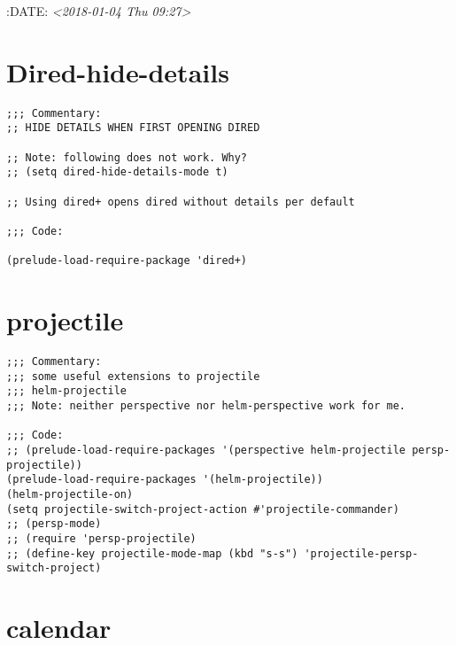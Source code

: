 \documentclass[11pt]{article}
\begin{document}
:DATE:     \textit{<2018-01-04 Thu 09:27>}
\section{Dired-hide-details}
\label{sec:org2a95887}

\begin{verbatim}
;;; Commentary:
;; HIDE DETAILS WHEN FIRST OPENING DIRED

;; Note: following does not work. Why?
;; (setq dired-hide-details-mode t)

;; Using dired+ opens dired without details per default

;;; Code:

(prelude-load-require-package 'dired+)
\end{verbatim}

\section{projectile}
\label{sec:org7df3bad}
\begin{verbatim}
;;; Commentary:
;;; some useful extensions to projectile
;;; helm-projectile
;;; Note: neither perspective nor helm-perspective work for me.

;;; Code:
;; (prelude-load-require-packages '(perspective helm-projectile persp-projectile))
(prelude-load-require-packages '(helm-projectile))
(helm-projectile-on)
(setq projectile-switch-project-action #'projectile-commander)
;; (persp-mode)
;; (require 'persp-projectile)
;; (define-key projectile-mode-map (kbd "s-s") 'projectile-persp-switch-project)
\end{verbatim}

\section{calendar}
\label{sec:orga9cd462}
\end{document}
